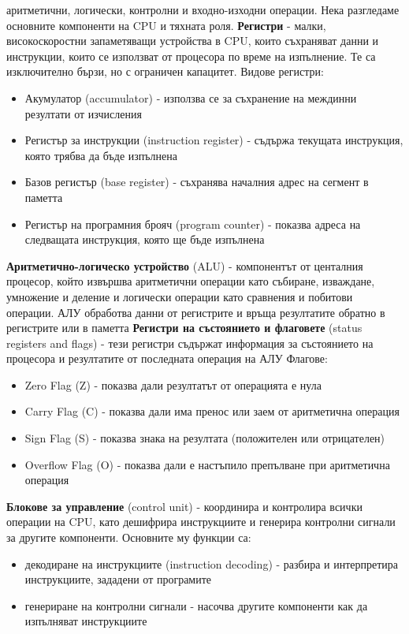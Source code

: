 \documentclass{article}
\begin{document}
аритметични, логически, контролни и входно-изходни операции. Нека разгледаме основните компоненти на CPU и тяхната роля. \newline\newline
\textbf{Регистри} - малки, високоскоростни запаметяващи устройства в CPU, които съхраняват данни и инструкции, които се използват от процесора по време на
изпълнение. Те са изключително бързи, но с ограничен капацитет. Видове регистри:
\begin{itemize}
    \item Акумулатор (accumulator) - използва се за съхранение на междинни резултати от изчисления
    \item Регистър за инструкции (instruction register) - съдържа текущата инструкция, която трябва да бъде изпълнена
    \item Базов регистър (base register) - съхранява началния адрес на сегмент в паметта
    \item Регистър на програмния брояч (program counter) - показва адреса на следващата инструкция, която ще бъде изпълнена
\end{itemize}
\textbf{Аритметично-логическо устройство} (ALU) - компонентът от центалния процесор, който извършва аритметични операции като събиране, изваждане, умножение
и деление и логически операции като сравнения и побитови операции. АЛУ обработва данни от регистрите и връща резултатите обратно в регистрите или в
паметта \newline\newline
\textbf{Регистри на състоянието и флаговете} (status registers and flags) - тези регистри съдържат информация за състоянието на процесора и резултатите от
последната операция на АЛУ
Флагове:
\begin{itemize}
    \item Zero Flag (Z) - показва дали резултатът от операцията е нула
    \item Carry Flag (C) - показва дали има пренос или заем от аритметична операция
    \item Sign Flag (S) - показва знака на резултата (положителен или отрицателен)
    \item Overflow Flag (O) - показва дали е настъпило препълване при аритметична операция
\end{itemize}
\textbf{Блокове за управление} (control unit) - координира и контролира всички операции на CPU, като дешифрира инструкциите и генерира контролни сигнали за
другите компоненти. Основните му функции са:
\begin{itemize}
    \item декодиране на инструкциите (instruction decoding) - разбира и интерпретира инструкциите, зададени от програмите
    \item генериране на контролни сигнали - насочва другите компоненти как да изпълняват инструкциите
\end{itemize}
\end{document}
